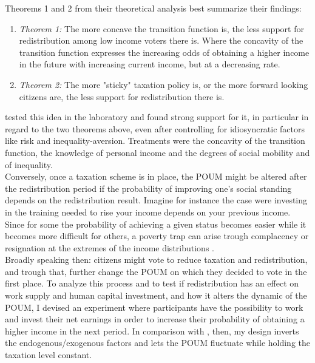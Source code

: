 Theorems 1 and 2 from their theoretical analysis best summarize their findings:
\begin{enumerate}
    \item \textit{Theorem 1:} The more concave the transition function is, the less support for redistribution among low income voters there is. Where the concavity of the transition function expresses the increasing odds of obtaining a higher income in the future with increasing current income, but at a decreasing rate.  
    \item \textit{Theorem 2:} The more "sticky" taxation policy is, or the more forward looking citizens are, the less support for redistribution there is.
\end{enumerate}

\cite{checchi2003} tested this idea in the laboratory and found strong support for it, in particular in regard to the two theorems above, even after controlling for idiosyncratic factors like risk and inequality-aversion. Treatments were the concavity of the transition function, the knowledge of personal income and the degrees of social mobility and of inequality.\\

Conversely, once a taxation scheme is in place, the POUM might be altered after the redistribution period if the probability of improving one's social standing depends on the redistribution result. Imagine for instance the case were investing in the training needed to rise your income depends on your previous income. Since for some the probability of achieving a given status becomes easier while it becomes more difficult for others, a poverty trap can arise trough complacency or resignation at the extremes of the income distributions  \citep{ceroni2001}.\\

Broadly speaking then: citizens might vote to reduce taxation and redistribution, and trough that, further change the POUM on which they decided to vote in the first place. To analyze this process and to test if redistribution has an effect on work supply and human capital investment, and how it alters the dynamic of the POUM, I devised an experiment where participants have the possibility to work and invest their net earnings in order to increase their probability of obtaining a higher income in the next period. In comparison with \cite{ok2000}, then, my design inverts the endogenous/exogenous factors and lets the POUM fluctuate while holding the taxation level constant.\\

